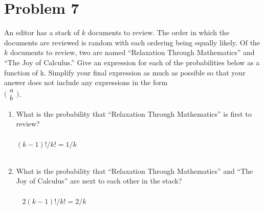 \documentclass{amsart}
\theoremstyle{definition}
\theoremstyle{Exercise}
\theoremstyle{remark}
\theoremstyle{rule}
\numberwithin{equation}{section}
\begin{document}
\section*{Problem 7}
An editor has a stack of $k$ documents to review.  The order in which the documents are reviewed is random with each ordering being equally likely. Of the $k$ documents to review, two are named ``Relaxation Through Mathematics'' and ``The Joy of Calculus.'' Give an expression for each of the probabilities below as a function of k. Simplify your final expression as much as possible so that your answer does not include any expressions in the form\\
$
\Big(
 \begin{array}{c}
 a\\
 b
    \end{array}
    \Big)
$.
 \begin{enumerate}[label=(\alph*)]
\item What is the probability that ``Relaxation Through Mathematics'' is first to review?\\\\
$(k-1)!/k! = 1/k$
\\\\
\item What is the probability that ``Relaxation Through Mathematics'' and ``The Joy of Calculus'' are next to each other in the stack?\\\\\
$2(k-1)!/k! = 2/k$
\\\\
\end{enumerate}
\end{document}
